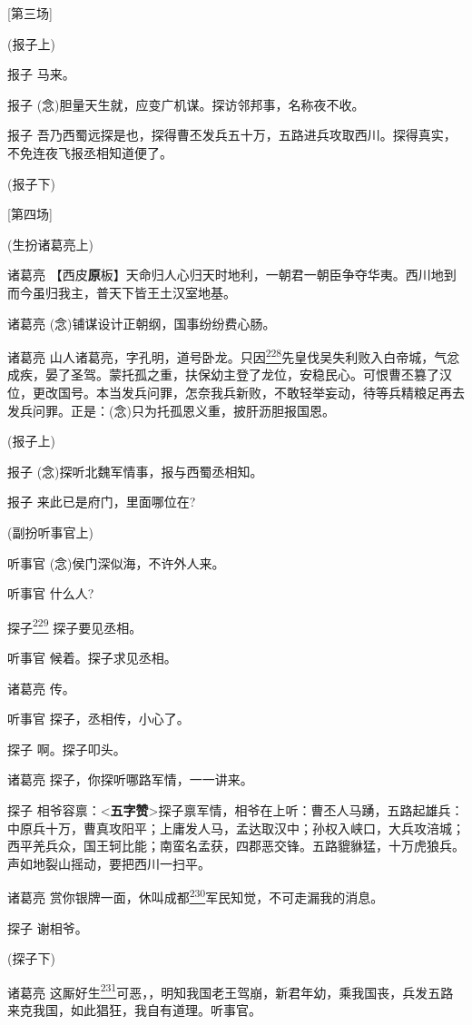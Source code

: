 {[}第三场{]}

(报子上)

报子 马来。

报子 (念)胆量天生就，应变广机谋。探访邻邦事，名称夜不收。

报子
吾乃西蜀远探是也，探得曹丕发兵五十万，五路进兵攻取西川。探得真实，不免连夜飞报丞相知道便了。

(报子下)

{[}第四场{]}

(生扮诸葛亮上)

诸葛亮
【西皮\textbf{原}板】天命归人心归天时地利，一朝君一朝臣争夺华夷。西川地到而今虽归我主，普天下皆王土汉室地基。

诸葛亮 (念)铺谋设计正朝纲，国事纷纷费心肠。

诸葛亮
山人诸葛亮，字孔明，道号卧龙。只因\protect\hyperlink{fn228}{\textsuperscript{228}}先皇伐吴失利败入白帝城，气忿成疾，晏了圣驾。蒙托孤之重，扶保幼主登了龙位，安稳民心。可恨曹丕篡了汉位，更改国号。本当发兵问罪，怎奈我兵新败，不敢轻举妄动，待等兵精粮足再去发兵问罪。正是：(念)只为托孤恩义重，披肝沥胆报国恩。

(报子上)

报子 (念)探听北魏军情事，报与西蜀丞相知。

报子 来此已是府门，里面哪位在?

(副扮听事官上)

听事官 (念)侯门深似海，不许外人来。

听事官 什么人?

探子\protect\hyperlink{fn229}{\textsuperscript{229}} 探子要见丞相。

听事官 候着。探子求见丞相。

诸葛亮 传。

听事官 探子，丞相传，小心了。

探子 啊。探子叩头。

诸葛亮 探子，你探听哪路军情，一一讲来。

探子
相爷容禀：\textless{}\textbf{五字赞}\textgreater{}探子禀军情，相爷在上听：曹丕人马踴，五路起雄兵：中原兵十万，曹真攻阳平；上庸发人马，孟达取汉中；孙权入峡口，大兵攻涪城；西平羌兵众，国王轲比能；南蛮名孟获，四郡恶交锋。五路貔貅猛，十万虎狼兵。声如地裂山摇动，要把西川一扫平。

诸葛亮
赏你银牌一面，休叫成都\protect\hyperlink{fn230}{\textsuperscript{230}}军民知觉，不可走漏我的消息。

探子 谢相爷。

(探子下)

诸葛亮
这厮好生\protect\hyperlink{fn231}{\textsuperscript{231}}可恶，，明知我国老王驾崩，新君年幼，乘我国丧，兵发五路来克我国，如此猖狂，我自有道理。听事官。

